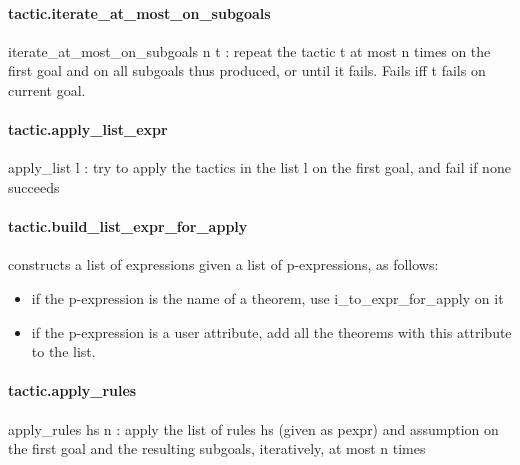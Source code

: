 \documentclass{article}
\begin{document}
\paragraph{tactic.iterate\_at\_most\_on\_subgoals}
\par
\colorbox[RGB]{253,246,227}{{{{\color[RGB]{101, 123, 131} iterate\_at\_most\_on\_subgoals n t }}}}: repeat the tactic 
\colorbox[RGB]{253,246,227}{{{{\color[RGB]{101, 123, 131} t }}}} at most 
\colorbox[RGB]{253,246,227}{{{{\color[RGB]{101, 123, 131} n }}}} times on the first
goal and on all subgoals thus produced, or until it fails. Fails iff 
\colorbox[RGB]{253,246,227}{{{{\color[RGB]{101, 123, 131} t }}}} fails on
current goal.
\paragraph{tactic.apply\_list\_expr}
\par
\colorbox[RGB]{253,246,227}{{{{\color[RGB]{101, 123, 131} apply\_list l }}}}: try to apply the tactics in the list 
\colorbox[RGB]{253,246,227}{{{{\color[RGB]{101, 123, 131} l }}}} on the first goal, and
fail if none succeeds
\paragraph{tactic.build\_list\_expr\_for\_apply}
\par
constructs a list of expressions given a list of p-expressions, as follows:
\begin{itemize}\item if the p-expression is the name of a theorem, use 
\colorbox[RGB]{253,246,227}{{{{\color[RGB]{101, 123, 131} i\_to\_expr\_for\_apply }}}} on it

\item if the p-expression is a user attribute, add all the theorems with this attribute
to the list.

\end{itemize}\paragraph{tactic.apply\_rules}
\par
\colorbox[RGB]{253,246,227}{{{{\color[RGB]{101, 123, 131} apply\_rules hs n }}}}: apply the list of rules 
\colorbox[RGB]{253,246,227}{{{{\color[RGB]{101, 123, 131} hs }}}} (given as pexpr) and 
\colorbox[RGB]{253,246,227}{{{{\color[RGB]{101, 123, 131} assumption }}}} on the
first goal and the resulting subgoals, iteratively, at most 
\colorbox[RGB]{253,246,227}{{{{\color[RGB]{101, 123, 131} n }}}} times
\end{document}
